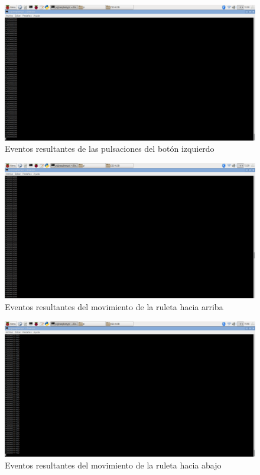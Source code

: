     \begin{figure}[p]
    \centering
    \includegraphics[scale = 0.25]{capitulo_04/figuras_dir/clickizq.jpg}
    \caption{Eventos resultantes de las pulsaciones del botón izquierdo}
    \label{fig: pulsaciones del botón izquierdo}
    \end{figure}
            
    \begin{figure}[p]
    \centering
    \includegraphics[scale = 0.25]{capitulo_04/figuras_dir/Raba.jpg}
    \caption{Eventos resultantes del movimiento de la ruleta hacia arriba}
    \label{fig: ruleta hacia arriba}
    \end{figure}
            
    \begin{figure}[p]
    \centering
    \includegraphics[scale = 0.25]{capitulo_04/figuras_dir/Rajo.jpg}
    \caption{Eventos resultantes del movimiento de la ruleta hacia abajo}
    \label{fig: ruleta hacia abajo}
    \end{figure}

